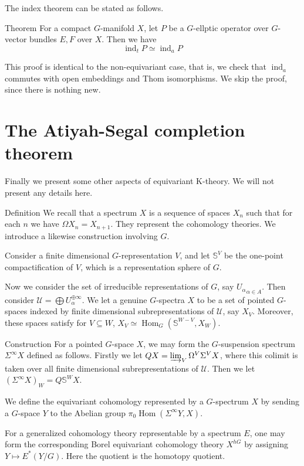 \documentclass{beamer}
\newcommand{\ilim}{\varinjlim}
\DeclareMathOperator{\Hom}{\mathrm{Hom}}
\DeclareMathOperator{\ind}{\mathrm{ind}}
\begin{document}
\begin{frame}
	The index theorem can be stated as follows. 
	\begin{alertblock}{Theorem}
		For a compact $G$-manifold $X$, let $P$ be a $G$-ellptic operator over $G$-vector bundles $E,F$ over $X$. Then we have 
		\[ \ind_tP\simeq\ind_aP \]
	\end{alertblock}
	This proof is identical to the non-equivariant case, that is, we check that $\ind_a$ commutes with open embeddings and Thom isomorphisms. We skip the proof, since there is nothing new. 
\end{frame}

\section{The Atiyah-Segal completion theorem}

\begin{frame}
	Finally we present some other aspects of equivariant K-theory. We will not present any details here. 
	\begin{block}{Definition}
		We recall that a spectrum $X$ is a sequence of spaces $X_n$ such that for each $n$ we have $\Omega X_n=X_{n+1}$. They represent the cohomology theories. We introduce a likewise construction involving $G$. 

		Consider a finite dimensional $G$-representation $V$, and let $\mathbb{S}^V$ be the one-point compactification of $V$, which is a representation sphere of $G$. 

		Now we consider the set of irreducible representations of $G$, say ${U_\alpha}_{\alpha\in A}$. Then consider $\mathcal{U}=\bigoplus U_\alpha^{\oplus\infty}$. We let a genuine $G$-spectra $X$ to be a set of pointed $G$-spaces indexed by finite dimensional subrepresentations of $\mathcal{U}$, say $X_V$. Moreover, these spaces satisfy for $V\subseteq W$, $X_V\simeq\Hom_G(\mathbb{S}^{W-V},X_W)$. 
	\end{block}
\end{frame}

\begin{frame}
	\begin{block}{Construction}
		For a pointed $G$-space $X$, we may form the $G$-suspension spectrum $\Sigma^\infty X$ defined as follows. Firstly we let $QX=\ilim_V\Omega^V\Sigma^VX$, where this colimit is taken over all finite dimensional subrepresentations of $\mathcal{U}$. Then we let $(\Sigma^\infty X)_W=Q\mathbb{S}^WX$. 

		We define the equivariant cohomology represented by a $G$-spectrum $X$ by sending a $G$-space $Y$ to the Abelian group $\pi_0\Hom(\Sigma^\infty Y,X)$. 

		For a generalized cohomology theory representable by a spectrum $E$, one may form the corresponding Borel equivariant cohomology theory $X^{hG}$ by assigning $Y\mapsto E^*(Y/G)$. Here the quotient is the homotopy quotient. 
	\end{block}
\end{frame}
\end{document}
